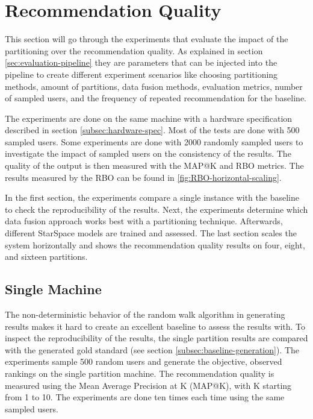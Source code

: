 \section{Recommendation Quality}
\label{sec:recommendation-quality}
This section will go through the experiments that evaluate the impact of the partitioning over the recommendation quality. As explained in section \ref{sec:evaluation-pipeline} they are parameters that can be injected into the pipeline to create different experiment scenarios like choosing partitioning methods, amount of partitions, data fusion methods, evaluation metrics, number of sampled users, and the frequency of repeated recommendation for the baseline.


The experiments are done on the same machine with a hardware specification described in section \ref{subsec:hardware-spec}. Most of the tests are done with 500 sampled users. Some experiments are done with 2000 randomly sampled users to investigate the impact of sampled users on the consistency of the results. The quality of the output is then measured with the MAP@K and RBO metrics. The results measured by the RBO can be found in \ref{fig:RBO-horizontal-scaling}.


In the first section, the experiments compare a single instance with the baseline to check the reproducibility of the results. Next, the experiments determine which data fusion approach works best with a partitioning technique. Afterwards, different StarSpace models are trained and assessed. The last section scales the system horizontally and shows the recommendation quality results on four, eight, and sixteen partitions. 


\subsection{Single Machine}
\label{subsec:eval-single-machine}
The non-deterministic behavior of the random walk algorithm in generating results makes it hard to create an excellent baseline to assess the results with. To inspect the reproducibility of the results, the single partition results are compared with the generated gold standard (see section \ref{subsec:baseline-generation}). The experiments sample 500 random users and generate the objective, observed rankings on the single partition machine. The recommendation quality is measured using the Mean Average Precision at K (MAP@K), with K starting from 1 to 10. The experiments are done ten times each time using the same sampled users. 

